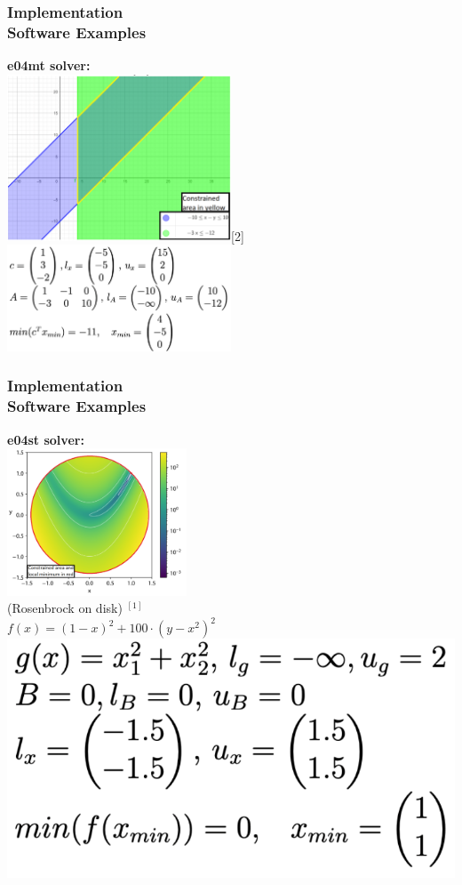 \documentclass[ucs,10pt]{beamer}
\begin{document}
\begin{frame}
\frametitle{Implementation \\
\small \color{rwth-blue} Software Examples}
\textbf{e04mt solver:}\\
\centering
\includegraphics[width=0.5\textwidth]{eg_mt.png}\tiny{[2]}
\includegraphics[width=0.5\textwidth]{eg_mt2.png}
\end{frame}

\begin{frame}
\frametitle{Implementation \\
\small \color{rwth-blue} Software Examples}
\textbf{e04st solver:}\\
\centering
\includegraphics[width=0.4\textwidth]{eg_st.png}\\
\small{(Rosenbrock on disk) $^{[1]}$\\$f(x)=(1-{x})^2+100\cdot ({y}-{x}^2)^2$}\\
\includegraphics[width=35ex]{eg_st2.png}
\end{frame}
\end{document}
